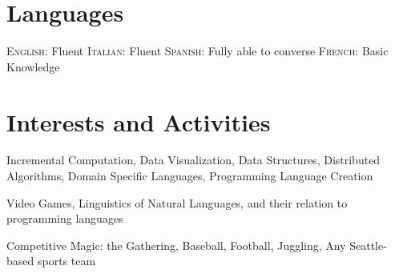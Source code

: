 \documentclass[letterpaper,10pt]{article} %
\begin{document}

\section{Languages}

\textsc{English:} Fluent \hfill \textsc{Italian:} Fluent \hfill 
\textsc{Spanish:} Fully able to converse \hfill \textsc{French:} Basic Knowledge




\section{Interests and Activities}

Incremental Computation, Data Visualization, Data Structures, Distributed Algorithms, Domain Specific Languages,
Programming Language Creation

Video Games, Linguistics of Natural Languages, and their relation to programming languages

Competitive Magic: the Gathering, Baseball, Football, Juggling, Any Seattle-based sports team

\end{document}
